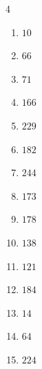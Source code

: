 \begin{multicols}{4}
\begin{enumerate}

  \item $10$


  \item $66$


  \item $71$


  \item $166$


  \item $229$


  \item $182$


  \item $244$


  \item $173$


\columnbreak %

  \item $178$


  \item $138$


  \item $121$


  \item $184$


  \item $14$


  \item $64$


  \item $224$



\end{enumerate}
\end{multicols}
